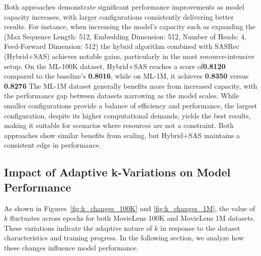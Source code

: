 Both approaches demonstrate significant performance improvements as model capacity increases, with larger configurations consistently delivering better results. For instance, when increasing the model's capacity such as expanding the (Max Sequence Length: 512, Embedding Dimension: 512, Number of Heads: 4, Feed-Forward Dimension: 512) the hybrid algorithm combined with SASRec (Hybrid+SAS) achieves notable gains, particularly in the most resource-intensive setup. On the ML-100K dataset, Hybrid+SAS reaches a score of\textbf{0.8120} compared to the baseline's \textbf{0.8016}, while on ML-1M, it achieves \textbf{0.8350} versus \textbf{0.8276} The ML-1M dataset generally benefits more from increased capacity, with the performance gap between datasets narrowing as the model scales. While smaller configurations provide a balance of efficiency and performance, the largest configuration, despite its higher computational demands, yields the best results, making it suitable for scenarios where resources are not a constraint. Both approaches show similar benefits from scaling, but Hybrid+SAS maintains a consistent edge in performance.


\subsection {Impact of Adaptive k-Variations on Model Performance}
As shown in Figures~\ref{fig:k_changes_100K} and \ref{fig:k_changes_1M}, the value of $k$ fluctuates across epochs for both MovieLens 100K and MovieLens 1M datasets. These variations indicate the adaptive nature of $k$ in response to the dataset characteristics and training progress. In the following section, we analyze how these changes influence model performance.  

